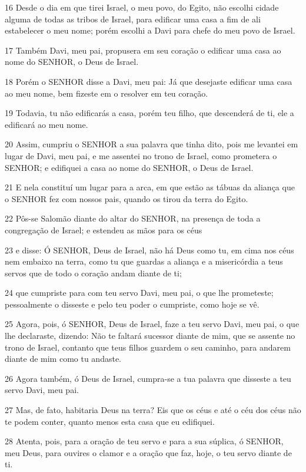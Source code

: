 \par 16 Desde o dia em que tirei Israel, o meu povo, do Egito, não escolhi cidade alguma de todas as tribos de Israel, para edificar uma casa a fim de ali estabelecer o meu nome; porém escolhi a Davi para chefe do meu povo de Israel.
\par 17 Também Davi, meu pai, propusera em seu coração o edificar uma casa ao nome do SENHOR, o Deus de Israel.
\par 18 Porém o SENHOR disse a Davi, meu pai: Já que desejaste edificar uma casa ao meu nome, bem fizeste em o resolver em teu coração.
\par 19 Todavia, tu não edificarás a casa, porém teu filho, que descenderá de ti, ele a edificará ao meu nome.
\par 20 Assim, cumpriu o SENHOR a sua palavra que tinha dito, pois me levantei em lugar de Davi, meu pai, e me assentei no trono de Israel, como prometera o SENHOR; e edifiquei a casa ao nome do SENHOR, o Deus de Israel.
\par 21 E nela constituí um lugar para a arca, em que estão as tábuas da aliança que o SENHOR fez com nossos pais, quando os tirou da terra do Egito.
\par 22 Pôs-se Salomão diante do altar do SENHOR, na presença de toda a congregação de Israel; e estendeu as mãos para os céus
\par 23 e disse: Ó SENHOR, Deus de Israel, não há Deus como tu, em cima nos céus nem embaixo na terra, como tu que guardas a aliança e a misericórdia a teus servos que de todo o coração andam diante de ti;
\par 24 que cumpriste para com teu servo Davi, meu pai, o que lhe prometeste; pessoalmente o disseste e pelo teu poder o cumpriste, como hoje se vê.
\par 25 Agora, pois, ó SENHOR, Deus de Israel, faze a teu servo Davi, meu pai, o que lhe declaraste, dizendo: Não te faltará sucessor diante de mim, que se assente no trono de Israel, contanto que teus filhos guardem o seu caminho, para andarem diante de mim como tu andaste.
\par 26 Agora também, ó Deus de Israel, cumpra-se a tua palavra que disseste a teu servo Davi, meu pai.
\par 27 Mas, de fato, habitaria Deus na terra? Eis que os céus e até o céu dos céus não te podem conter, quanto menos esta casa que eu edifiquei.
\par 28 Atenta, pois, para a oração de teu servo e para a sua súplica, ó SENHOR, meu Deus, para ouvires o clamor e a oração que faz, hoje, o teu servo diante de ti.
